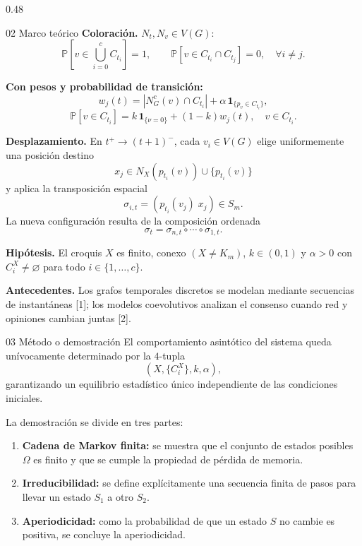 \documentclass[final]{beamer}
\newcommand{\Prob}{\mathbb{P}}
\begin{document}
\begin{frame}[t]
\begin{columns}[t]
\begin{column}{0.48\paperwidth}
\begin{block}{02 Marco teórico}
\vspace{0.2cm}
\textbf{Coloración.} \(N_t,N_v\in V(G)\):
\[
\Prob\left[v\in \bigcup_{i=0}^{c}C_{t_i}\right]=1,
\qquad
\Prob\left[v\in C_{t_i}\cap C_{t_j}\right]=0,
\quad \forall i\ne j.
\]

\vspace{0.2cm}
\textbf{Con pesos y probabilidad de transición:}
\[
w_j(t)=|N^c_G(v)\cap C_{t_i}|+\alpha\,\mathbf{1}_{\{p_v\in C_{t_i}\}},
\]
\[
\Prob[v\in C_{t_i}]
=
k\,\mathbf{1}_{\{\nu=0\}}+(1-k)w_j(t),
\quad v\in C_{t_i}.
\]

\vspace{0.2cm}
\textbf{Desplazamiento.} En \(t^+\to(t+1)^-\), cada \(v_i\in V(G)\) elige uniformemente una posición destino
\[
x_j\in N_X(p_{t_i}(v))\cup\{p_{t_i}(v)\}
\]
y aplica la transposición espacial
\[
\sigma_{i,t}=(p_{t_i}(v_j)\;x_j)\in S_m.
\]
La nueva configuración resulta de la composición ordenada
\[
\sigma_t=\sigma_{n,t}\circ\cdots\circ\sigma_{1,t}.
\]

\vspace{0.2cm}
\textbf{Hipótesis.} El croquis \(X\) es finito, conexo \((X\ne K_m)\), \(k\in(0,1)\) y \(\alpha>0\) con \(C_i^X\ne\varnothing\) para todo \(i\in\{1,\dots,c\}\).

\vspace{0.2cm}
\textbf{Antecedentes.} Los grafos temporales discretos se modelan mediante secuencias de instantáneas [1]; los modelos coevolutivos analizan el consenso cuando red y opiniones cambian juntas [2].
\end{block}

\begin{block}{03 Método o demostración}
El comportamiento asintótico del sistema queda unívocamente determinado por la \(4\)-tupla
\[
(X,\{C_i^X\},k,\alpha),
\]
garantizando un equilibrio estadístico único independiente de las condiciones iniciales.

\vspace{0.3cm}
La demostración se divide en tres partes:
\begin{enumerate}
\item \textbf{Cadena de Markov finita:} se muestra que el conjunto de estados posibles \(\Omega\) es finito y que se cumple la propiedad de pérdida de memoria.
\item \textbf{Irreducibilidad:} se define explícitamente una secuencia finita de pasos para llevar un estado \(S_1\) a otro \(S_2\).
\item \textbf{Aperiodicidad:} como la probabilidad de que un estado \(S\) no cambie es positiva, se concluye la aperiodicidad.
\end{enumerate}
\end{block}


\end{column}
\end{columns}
\end{frame}
\end{document}
